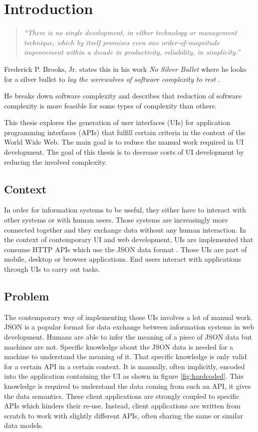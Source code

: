 \section{Introduction}\label{introduction}

\begin{quotation}
\textit{``There is no single development, in either technology or management technique, which by itself promises even one order-of-magnitude improvement within a decade in productivity, reliability, in simplicity.''} \citep[p.~1]{nosilverbullet}
\end{quotation}

Frederick P. Brooks, Jr. states this in his work \textit{No Silver Bullet} where he looks for a silver bullet to \textit{lay the werewolves of software complexity to rest} \citep[p.~1]{nosilverbullet}.

He breaks down software complexity and describes that reduction of software complexity is more feasible for some types of complexity than others.

This thesis explores the generation of user interfaces (UIs) for application programming interfaces (APIs) that fulfill certain criteria in the context of the World Wide Web. The main goal is to reduce the manual work required in UI development. The goal of this thesis is to decrease costs of UI development by reducing the involved complexity.

\subsection{Context}\label{context}
In order for information systems to be useful, they either have to interact with other systems or with human users. Those systems are increasingly more connected together and they exchange data without any human interaction. In the context of contemporary UI and web development, UIs are implemented that consume HTTP APIs which use the JSON data format \citep{jsonformat}. Those UIs are part of mobile, desktop or browser applications. End users interact with applications through UIs to carry out tasks.

\subsection{Problem}\label{problem}
The contemporary way of implementing those UIs involves a lot of manual work. JSON is a popular format for data exchange between information systems in web development. Humans are able to infer the meaning of a piece of JSON data but machines are not. Specific knowledge about the JSON data is needed for a machine to understand the meaning of it. That specific knowledge is only valid for a certain API in a certain context. It is manually, often implicitly, encoded into the application containing the UI as shown in figure \ref{fig:hardcoded}. This knowledge is required to understand the data coming from such an API, it gives the data semantics. These client applications are strongly coupled to specific APIs which hinders their re-use. Instead, client applications are written from scratch to work with slightly different APIs, often sharing the same or similar data models.

